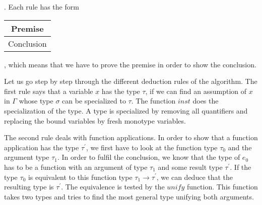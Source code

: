 \begin{prooftree}
\end{prooftree}

\begin{prooftree}
\end{prooftree}

\begin{prooftree}
\end{prooftree}

\begin{prooftree}
\end{prooftree}
.
Each rule has the form
\begin{tabular}{c}
Premise\\
\hline
Conclusion
\end{tabular}, which means that we have to prove the premise in order to show the conclusion.

Let us go step by step through the different deduction rules of the algorithm.
The first rule says that a variable $x$ has the type $\tau$, if we can find an assumption of $x$ in $\Gamma$ whose type $\sigma$ can be specialized to $\tau$.
The function $inst$ does the specialization of the type.
A type is specialized by removing all quantifiers and replacing the bound variables by fresh monotype variables.

The second rule deals with function applications.
In order to show that a function application has the type $\tau^\prime$, we first have to look at the function type $\tau_0$ and the argument type $\tau_1$.
In order to fulfil the conclusion, we know that the type of $e_0$ has to be a function with an argument of type $\tau_1$ and some result type $\tau^\prime$.
If the type $\tau_0$ is equivalent to this function type $\tau_1\rightarrow\tau^\prime$, we can deduce that the resulting type is $\tau^\prime$.
The equivalence is tested by the $unify$ function.
This function takes two types and tries to find the most general type unifying both arguments.

